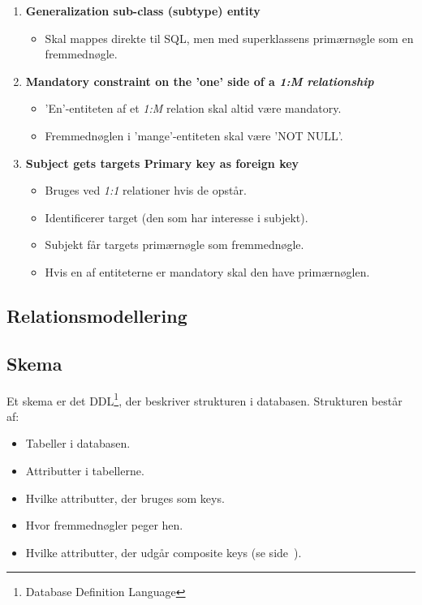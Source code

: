 \begin{enumerate}
	\item \textbf{Generalization sub-class (subtype) entity}
	\begin{itemize}
		\item Skal mappes direkte til SQL, men med superklassens primærnøgle som en fremmednøgle.
	\end{itemize}
	
	\item \textbf{Mandatory constraint on the 'one' side of a \textit{1:M relationship}}
	\begin{itemize}
		\item 'En'-entiteten af et \textit{1:M} relation skal altid være mandatory.
		\item Fremmednøglen i 'mange'-entiteten skal være 'NOT NULL'.
	\end{itemize}
		
	\item \textbf{Subject gets targets Primary key as foreign key}
	\begin{itemize}
		\item Bruges ved \textit{1:1} relationer hvis de opstår.
		\item Identificerer target (den som har interesse i subjekt).
		\item Subjekt får targets primærnøgle som fremmednøgle.
		\item Hvis en af entiteterne er mandatory skal den have primærnøglen.
	\end{itemize}
	
\end{enumerate}

\subsection{Relationsmodellering}

\subsection{Skema}
Et skema er det DDL\footnote{Database Definition Language}, der beskriver strukturen i databasen.
Strukturen består af:

\begin{itemize}
	\item Tabeller i databasen.
	\item Attributter i tabellerne.
	\item Hvilke attributter, der bruges som keys.
	\item Hvor fremmednøgler peger hen.
	\item Hvilke attributter, der udgår composite keys (se side~\pageref{sec:keys}).
\end{itemize}






























